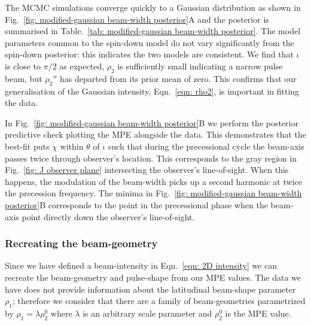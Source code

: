 \documentclass[../full_thesis/full_thesis.tex]{subfiles}
\newcommand{\thisdir}{../comparing_periodic_modulations}
\newcommand{\bigfigurecaptions}[2]{
$\textbf{A}$: The estimated marginal posterior probability distribution for the
#1 #2 model parameters. $\textbf{B}$: Checking the fit of the model using the
maximum posterior values to the data; see Fig.~\ref{fig: noise-only beam-width
posterior fit} for a complete description.}
\begin{document}
The MCMC simulations converge quickly to a Gaussian distribution as shown in
Fig.~\ref{fig: modified-gaussian beam-width posterior}A and the posterior is
summarised in Table.~\ref{tab: modified-gaussian beam-width posterior}. The model parameters
common to the spin-down model do not vary significantly from the spin-down
posterior: this indicates the two models are consistent. We find that $\iota$
is close to $\pi/2$ as expected, $\rho_2$ is sufficiently small indicating a
narrow pulse beam, but $\rho_2''$ has departed from its prior mean of zero.
This confirms that our generalisation of the Gaussian intensity,
Eqn.~\eqref{eqn: rho2}, is important in fitting the data.
\begin{figure*}
\centering
\texttt{[image: \{Beamwidth\_ModifiedGaussian\_0.1\_PosteriorWithFit]}.pdf}
\caption{\bigfigurecaptions{modified-Gaussian precession}{beam-width}}
\label{fig: modified-gaussian beam-width posterior}
\end{figure*}
\begin{table}
\centering
\caption{Posterior estimates for the beam-width modified-Gaussian precession model.}
\label{tab: modified-gaussian beam-width posterior}

\end{table}

In Fig.~\ref{fig: modified-gaussian beam-width posterior}B we perform the
posterior predictive check plotting the MPE alongside the data.  This
demonstrates that the best-fit puts $\chi$ within $\theta$ of $\iota$ such that
during the precessional cycle the beam-axis passes twice through observer's
location. This corresponds to the gray region in Fig.~\ref{fig: J observer
plane} intersecting the observer's line-of-sight. When this happens, the
modulation of the beam-width picks up a second harmonic at twice the precession
frequency. The minima in Fig.~\ref{fig: modified-gaussian beam-width
posterior}B corresponds to the point in the precessional phase when the
beam-axis point directly down the observer's line-of-sight.



\subsubsection{Recreating the beam-geometry}
\label{sec: recreating the beam-geometry}

Since we have defined a beam-intensity in Eqn.~\eqref{eqn: 2D intensity} we can
recreate the beam-geometry and pulse-shape from our MPE values.  The data we
have does not provide information about the latitudinal beam-shape parameter
$\rho_1$; therefore we consider that there are a family of beam-geometries
parametrized by $\rho_1 = \lambda \rho_2^0$ where $\lambda$ is an arbitrary
scale parameter and $\rho_2^0$ is the MPE value.
\end{document}
